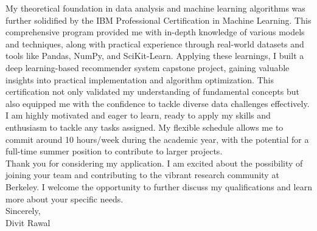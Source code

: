 \documentclass[letterpaper,11pt]{article}
\begin{document}
\vspace{5mm}
My theoretical foundation in data analysis and machine learning algorithms was further solidified by the IBM Professional Certification in Machine Learning. This comprehensive program provided me with in-depth knowledge of various models and techniques, along with practical experience through real-world datasets and tools like Pandas, NumPy, and SciKit-Learn. Applying these learnings, I built a deep learning-based recommender system capstone project, gaining valuable insights into practical implementation and algorithm optimization. This certification not only validated my understanding of fundamental concepts but also equipped me with the confidence to tackle diverse data challenges effectively.\\
\vspace{5mm}
I am highly motivated and eager to learn, ready to apply my skills and enthusiasm to tackle any tasks assigned. My flexible schedule allows me to commit around 10 hours/week during the academic year, with the potential for a full-time summer position to contribute to larger projects.\\
\vspace{5mm}
Thank you for considering my application. I am excited about the possibility of joining your team and contributing to the vibrant research community at Berkeley. I welcome the opportunity to further discuss my qualifications and learn more about your specific needs.\\
\vspace{5mm}
Sincerely,\\
Divit Rawal
\end{document}
